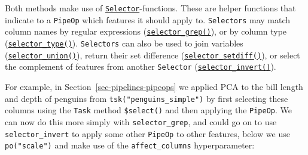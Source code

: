 Both methods make use of
\href{https://mlr3pipelines.mlr-org.com/reference/Selector.html}{\texttt{Selector}}-functions.
These are helper functions that indicate to a \texttt{PipeOp} which
features it should apply to. \texttt{Selectors} may match column names
by regular expressions
(\href{https://mlr3pipelines.mlr-org.com/reference/Selector.html}{\texttt{selector\_grep()}}),
or by column type
(\href{https://mlr3pipelines.mlr-org.com/reference/Selector.html}{\texttt{selector\_type()}}).
\texttt{Selectors} can also be used to join variables
(\href{https://mlr3pipelines.mlr-org.com/reference/Selector.html}{\texttt{selector\_union()}}),
return their set difference
(\href{https://mlr3pipelines.mlr-org.com/reference/Selector.html}{\texttt{selector\_setdiff()}}),
or select the complement of features from another \texttt{Selector}
(\href{https://mlr3pipelines.mlr-org.com/reference/Selector.html}{\texttt{selector\_invert()}}).

For example, in Section~\ref{sec-pipelines-pipeops} we applied PCA to
the bill length and depth of penguins from
\texttt{tsk("penguins\_simple")} by first selecting these columns using
the \texttt{Task} method \texttt{\$select()} and then applying the
\texttt{PipeOp}. We can now do this more simply with
\texttt{selector\_grep}, and could go on to use
\texttt{selector\_invert} to apply some other \texttt{PipeOp} to other
features, below we use \texttt{po("scale")} and make use of the
\texttt{affect\_columns} hyperparameter:

\begin{Shaded}
\begin{Highlighting}[]
\OtherTok{=} \NormalTok{(}\NormalTok{)}
\OtherTok{=} 

\OtherTok{=} \NormalTok{(}\NormalTok{, }\SpecialCharTok{\%\textgreater{}\textgreater{}\%}
  \NormalTok{(}\NormalTok{, }

\OtherTok{=}\SpecialCharTok{$}\NormalTok{(}\NormalTok{(}\NormalTok{))}
\NormalTok{result[[}\NormalTok{]]}\SpecialCharTok{$}\NormalTok{()[}\SpecialCharTok{:}\NormalTok{, }\SpecialCharTok{:}\NormalTok{]}
\end{Highlighting}
\end{Shaded}


